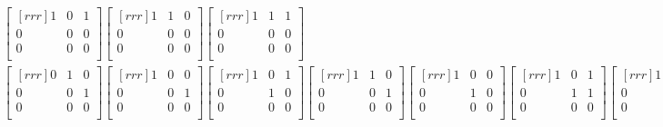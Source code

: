 \documentclass[12pt]{article}
\begin{document}
\begin{enumerate}
\begin{align*}
\begin{bmatrix}[rrr]
1 & 0 & 1\\
0 & 0 & 0\\
0 & 0 & 0\\
\end{bmatrix}
\begin{bmatrix}[rrr]
1 & 1 & 0\\
0 & 0 & 0\\
0 & 0 & 0\\
\end{bmatrix}
\begin{bmatrix}[rrr]
1 & 1 & 1\\
0 & 0 & 0\\
0 & 0 & 0\\
\end{bmatrix}\\
%
\begin{bmatrix}[rrr]
0 & 1 & 0\\
0 & 0 & 1\\
0 & 0 & 0\\
\end{bmatrix}
\begin{bmatrix}[rrr]
1 & 0 & 0\\
0 & 0 & 1\\
0 & 0 & 0\\
\end{bmatrix}
\begin{bmatrix}[rrr]
1 & 0 & 1\\
0 & 1 & 0\\
0 & 0 & 0\\
\end{bmatrix}
\begin{bmatrix}[rrr]
1 & 1 & 0\\
0 & 0 & 1\\
0 & 0 & 0\\
\end{bmatrix}
\begin{bmatrix}[rrr]
1 & 0 & 0\\
0 & 1 & 0\\
0 & 0 & 0\\
\end{bmatrix}
\begin{bmatrix}[rrr]
1 & 0 & 1\\
0 & 1 & 1\\
0 & 0 & 0\\
\end{bmatrix}
\begin{bmatrix}[rrr]
1 & 0 & 0\\
0 & 1 & 1\\
0 & 0 & 0\\

\end{bmatrix}
\end{align*}
\end{enumerate}
\end{document}

